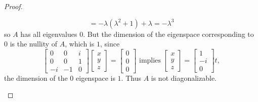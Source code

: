 \documentclass{article}
\begin{document}
\begin{proof}
\begin{enumerate}[(a)]
\[      = -\lambda(\lambda^2 + 1) + \lambda
      = -\lambda^3
    \] so $A$ has all eigenvalues $0$.
    But the dimension of the eigenspace corresponding to $0$ is the nullity of
    $A$, which is $1$, since \[
      \begin{bmatrix}
        0  & 0  & i \\
        0  & 0  & 1 \\
        -i & -1 & 0
      \end{bmatrix}
      \begin{bmatrix} x \\ y \\ z \end{bmatrix}
      = \begin{bmatrix} 0 \\ 0 \\ 0 \end{bmatrix}
      \text{ implies }
      \begin{bmatrix} x \\ y \\ z \end{bmatrix}
      = \begin{bmatrix} 1 \\ -i \\ 0 \end{bmatrix}t,
    \] the dimension of the $0$ eigenspace is $1$. Thus $A$ is not
    diagonalizable.
  \end{enumerate}
\end{proof}
\begin{problem}{3} ~
\end{problem}
\end{document}

